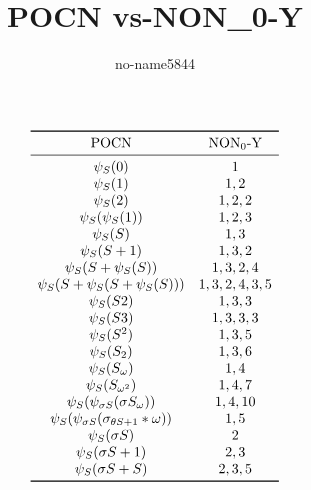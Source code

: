 \documentclass[UTF8]{ctexart}
\title{POCN vs-NON\_0-Y}   %
\author{no-name5844}
\newcommand{\s}{\sigma}
\newcommand{\p}{\psi}
\newcommand{\pS}{\psi_S}
\newcommand{\w}{\omega}
\renewcommand{\t}{\theta}
\begin{document}
\maketitle

\[
\begin{array}{ccc}
  \toprule
  \text{POCN} & \text{NON}_0\text{-Y} \\   %
  \midrule
  \pS(0) & 1\\
  \pS(1) & 1,2\\
  \pS(2) & 1,2,2\\
  \pS(\pS(1)) & 1,2,3\\
  \pS(S) & 1,3\\
  \pS(S+1) & 1,3,2\\
  \pS(S+\pS(S)) & 1,3,2,4\\
  \pS(S+\pS(S+\pS(S))) & 1,3,2,4,3,5\\
  \pS(S2) & 1,3,3\\
  \pS(S3) & 1,3,3,3\\
  \pS(S^2) & 1,3,5\\
  \pS(S_2) & 1,3,6\\
  \pS(S_\omega) & 1,4\\
  \pS(S_{\omega^2}) & 1,4,7\\
  \pS(\p_{\s S}(\s S_\omega)) & 1,4,10\\
  \pS(\p_{\s S}(\s_{\t S+1}*\w)) & 1,5\\
  \pS(\s S) & 2\\
  \pS(\s S+1) & 2,3\\
  \pS(\s S+S) & 2,3,5\\
  
  \bottomrule
\end{array}
\]
\end{document}
